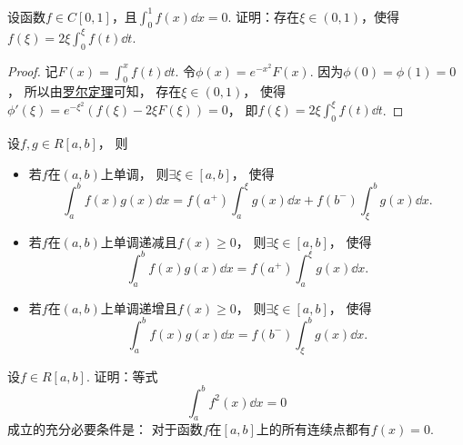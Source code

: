 \begin{example}
设函数\(f \in C[0,1]\)，且\(\int_0^1 f(x) \dd{x} = 0\).
证明：存在\(\xi\in(0,1)\)，使得\(f(\xi) = 2\xi \int_0^\xi f(t) \dd{t}\).
\begin{proof}
记\(F(x) = \int_0^x f(t) \dd{t}\).
令\(\phi(x) = e^{-x^2} F(x)\).
因为\(\phi(0) = \phi(1) = 0\)，
所以由\hyperref[theorem:微分中值定理.罗尔定理]{罗尔定理}可知，
存在\(\xi\in(0,1)\)，
使得\(\phi'(\xi)
= e^{-\xi^2} (f(\xi) - 2\xi F(\xi))
= 0\)，
即\(f(\xi) = 2\xi \int_0^\xi f(t) \dd{t}\).
\end{proof}
\end{example}

\begin{theorem}[积分第二中值定理]\label{theorem:定积分.积分中值定理2}
设\(f,g \in R[a,b]\)，
则\begin{itemize}
	\item 若\(f\)在\((a,b)\)上单调，
	则\(\exists \xi \in [a,b]\)，
	使得\begin{equation*}
		\int_a^b f(x) g(x) \dd{x}
		= f(a^+) \int_a^{\xi} g(x) \dd{x} + f(b^-) \int_{\xi}^b g(x) \dd{x}.
	\end{equation*}
	\item 若\(f\)在\((a,b)\)上单调递减且\(f(x) \geq 0\)，
	则\(\exists \xi \in [a,b]\)，
	使得\begin{equation*}
		\int_a^b f(x) g(x) \dd{x}
		= f(a^+) \int_a^{\xi} g(x) \dd{x}.
	\end{equation*}
	\item 若\(f\)在\((a,b)\)上单调递增且\(f(x) \geq 0\)，
	则\(\exists \xi \in [a,b]\)，
	使得\begin{equation*}
		\int_a^b f(x) g(x) \dd{x}
		= f(b^-) \int_{\xi}^b g(x) \dd{x}.
	\end{equation*}
\end{itemize}
\end{theorem}

\begin{example}
设\(f \in R[a,b]\).
证明：等式\begin{equation*}
	\int_a^b f^2(x) \dd{x} = 0
\end{equation*}成立的充分必要条件是：
对于函数\(f\)在\([a,b]\)上的所有连续点都有\(f(x)=0\).
\end{example}

